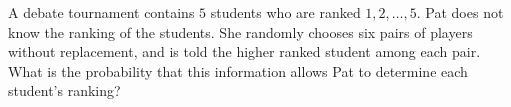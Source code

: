 A debate tournament contains $5$ students who are ranked $1,2,\dots,5$. Pat does not know the ranking of the students. She randomly chooses six pairs of players without replacement, and is told the higher ranked student among each pair. What is the probability that this information allows Pat to determine each student's ranking?
